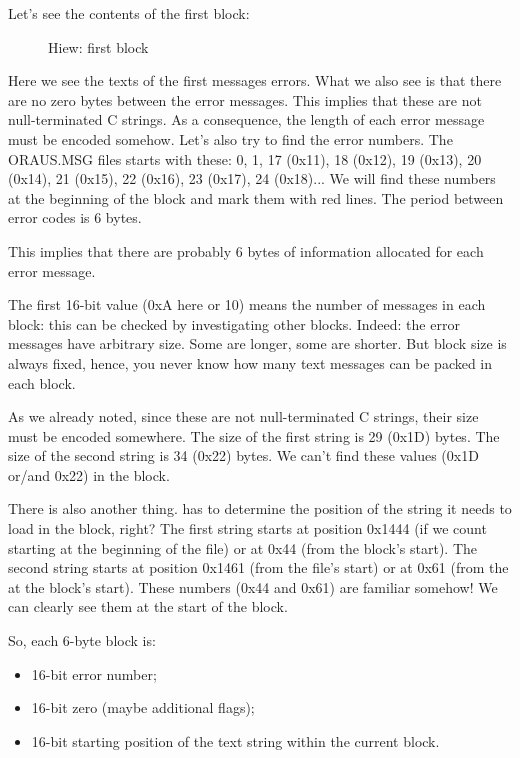 \clearpage
Let's see the contents of the first block:

\begin{figure}[H]
\centering
{}
\caption{Hiew: first block}
\label{fig:oracle_MSB_2}
\end{figure}

Here we see the texts of the first messages errors.
What we also see is 
that there are no zero bytes between the error messages.
This implies that these are not null-terminated C strings.
As a consequence, 
the length of each error message must be encoded somehow.
Let's also try to find the error numbers.
The ORAUS.MSG files starts with these: 
0, 1, 17 (0x11), 18 (0x12), 19 (0x13), 20 (0x14), 21 (0x15), 22 (0x16), 23 (0x17), 24 (0x18)...
We will find these numbers at the beginning 
of the block and mark them with red lines.
The period between error codes is 6 bytes.

This implies that there are probably 6 bytes of information allocated for each error message.

The first 16-bit value (0xA here or 10) means the number of messages in each block: this can be checked by investigating other blocks.
Indeed: the error messages have arbitrary size. 
Some are longer, some are shorter. 
But block size is always fixed, hence,
you never know how many text messages can be packed in each block.

As we already noted, since these are not null-terminated C strings, their size must be encoded somewhere.
The size of the first string  is 
29 (0x1D) bytes.
The size of the second string  
is 34 (0x22) bytes.
We can't find these values (0x1D or/and 0x22) in the block.%

There is also another thing.
\oracle 
has to determine the position of the string it needs to load in the block, right?
The first string  starts 
at  position 0x1444 (if we count starting at the beginning of the file) or at 0x44 (from the block's start).
The second string  
starts at position 0x1461 (from the
file's start) or at 0x61 (from the at the block's start).
These numbers (0x44 and 0x61) are familiar somehow! 
We can clearly see them at the start of the block.

So, each 6-byte block is:

\begin{itemize}
\item 16-bit error number; 
\item 16-bit zero (maybe additional flags); 
\item 16-bit starting position of 
the text string within the current block.
\end{itemize}

